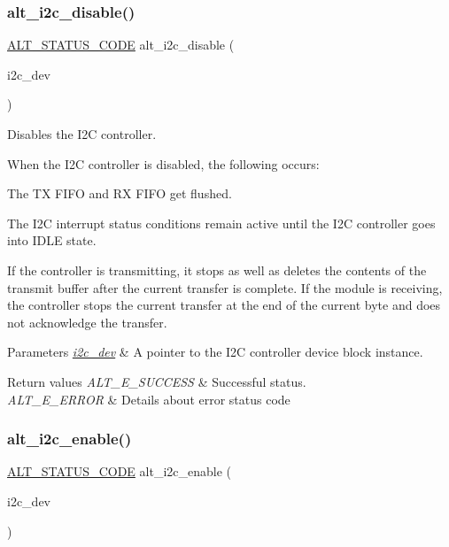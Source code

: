 \subsubsection{\texorpdfstring{alt\_i2c\_disable()}{alt\_i2c\_disable()}}
{\footnotesize\ttfamily \mbox{\hyperlink{hwlib_8h_abdb0d369f069723ca55d6c94bcaaaa12}{A\+L\+T\+\_\+\+S\+T\+A\+T\+U\+S\+\_\+\+C\+O\+DE}} alt\+\_\+i2c\+\_\+disable (\begin{DoxyParamCaption}\item[{\mbox{\hyperlink{structALT__I2C__DEV__s}{A\+L\+T\+\_\+\+I2\+C\+\_\+\+D\+E\+V\+\_\+t}} $\ast$}]{i2c\+\_\+dev }\end{DoxyParamCaption})}

Disables the I2C controller.

When the I2C controller is disabled, the following occurs\+:
\begin{DoxyItemize}
\item The TX F\+I\+FO and RX F\+I\+FO get flushed.
\item The I2C interrupt status conditions remain active until the I2C controller goes into I\+D\+LE state.
\end{DoxyItemize}

If the controller is transmitting, it stops as well as deletes the contents of the transmit buffer after the current transfer is complete. If the module is receiving, the controller stops the current transfer at the end of the current byte and does not acknowledge the transfer.


\begin{DoxyParams}{Parameters}
{\em \mbox{\hyperlink{structi2c__dev}{i2c\+\_\+dev}}} & A pointer to the I2C controller device block instance.\\
\hline
\end{DoxyParams}

\begin{DoxyRetVals}{Return values}
{\em A\+L\+T\+\_\+\+E\+\_\+\+S\+U\+C\+C\+E\+SS} & Successful status. \\
\hline
{\em A\+L\+T\+\_\+\+E\+\_\+\+E\+R\+R\+OR} & Details about error status code \\
\hline
\end{DoxyRetVals}
\mbox{\label{group__ALT__I2C_ga60c931e6e918b963313fc729c5418289}} 
\subsubsection{\texorpdfstring{alt\_i2c\_enable()}{alt\_i2c\_enable()}}
{\footnotesize\ttfamily \mbox{\hyperlink{hwlib_8h_abdb0d369f069723ca55d6c94bcaaaa12}{A\+L\+T\+\_\+\+S\+T\+A\+T\+U\+S\+\_\+\+C\+O\+DE}} alt\+\_\+i2c\+\_\+enable (\begin{DoxyParamCaption}\item[{\mbox{\hyperlink{structALT__I2C__DEV__s}{A\+L\+T\+\_\+\+I2\+C\+\_\+\+D\+E\+V\+\_\+t}} $\ast$}]{i2c\+\_\+dev }\end{DoxyParamCaption})}

